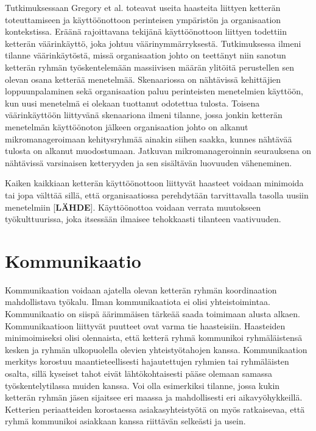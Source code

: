 Tutkimuksessaan Gregory et al. \cite{GREGORY201692} toteavat useita haasteita liittyen ketterän toteuttamiseen ja käyttöönottoon perinteisen ympäristön ja organisaation kontekstissa. Eräänä rajoittavana tekijänä käyttöönottoon liittyen todettiin ketterän väärinkäyttö, joka johtuu väärinymmärryksestä. Tutkimuksessa ilmeni tilanne väärinkäytöstä, missä organisaation johto on teettänyt niin sanotun ketterän ryhmän työskentelemään massiivisen määrän ylitöitä perustellen sen olevan osana ketterää menetelmää. Skenaariossa on nähtävissä kehittäjien loppuunpalaminen sekä organisaation paluu perinteisten menetelmien käyttöön, kun uusi menetelmä ei olekaan tuottanut odotettua tulosta. Toisena väärinkäyttöön liittyvänä skenaariona ilmeni tilanne, jossa jonkin ketterän menetelmän käyttöönoton jälkeen organisaation johto on alkanut mikromanageroimaan kehitysryhmää ainakin siihen saakka, kunnes nähtävää tulosta on alkanut muodostumaan. Jatkuvan mikromanageroinnin seurauksena on nähtävissä varsinaisen ketteryyden ja sen sisältävän luovuuden väheneminen.

Kaiken kaikkiaan ketterän käyttöönottoon liittyvät haasteet voidaan minimoida tai jopa välttää sillä, että organisaatiossa perehdytään tarvittavalla tasolla uusiin menetelmiin [\textbf{LÄHDE}]. Käyttöönottoa voidaan verrata muutokseen työkulttuurissa, joka itsessään ilmaisee tehokkaasti tilanteen vaativuuden.

\section{Kommunikaatio}

Kommunikaation voidaan ajatella olevan ketterän ryhmän koordinaation mahdollistava työkalu. Ilman kommunikaatiota ei olisi yhteistoimintaa. Kommunikaatio on siispä äärimmäisen tärkeää saada toimimaan alusta alkaen. Kommunikaatioon liittyvät puutteet ovat varma tie haasteisiin. Haasteiden minimoimiseksi olisi olennaista, että ketterä ryhmä kommunikoi ryhmäläistensä kesken ja ryhmän ulkopuolella olevien yhteistyötahojen kanssa. Kommunikaation merkitys korostuu maantieteellisesti hajautettujen ryhmien tai ryhmäläisten osalta, sillä kyseiset tahot eivät lähtökohtaisesti pääse olemaan samassa työskentelytilassa muiden kanssa. Voi olla esimerkiksi tilanne, jossa kukin ketterän ryhmän jäsen sijaitsee eri maassa ja mahdollisesti eri aikavyöhykkeillä. Ketterien periaatteiden korostaessa asiakasyhteistyötä on myös ratkaisevaa, että ryhmä kommunikoi asiakkaan kanssa riittävän selkeästi ja usein.

